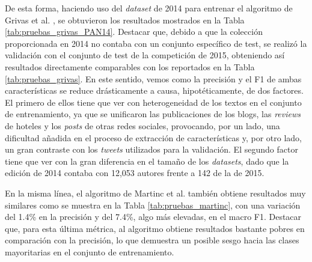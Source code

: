 \bigskip
De esta forma, haciendo uso del \textit{dataset} de 2014 para entrenar el algoritmo de Grivas et al. \cite{grivas2015author}, se obtuvieron los resultados
mostrados en la Tabla \ref{tab:pruebas_grivas_PAN14}. Destacar que, debido a que la colección proporcionada en 2014 no contaba con un conjunto específico de test, se realizó la validación
con el conjunto de test de la competición de 2015, obteniendo así resultados directamente comparables con los reportados en la Tabla \ref{tab:pruebas_grivas}.
En este sentido, vemos como la precisión y el F1 de ambas características se reduce drásticamente a causa, hipotéticamente, de dos factores. El primero de ellos
tiene que ver con heterogeneidad de los textos en el conjunto de entrenamiento, ya que se unificaron las publicaciones de los blogs, las \textit{reviews} de hoteles y
los \textit{posts} de otras redes sociales, provocando, por un lado, una dificultad añadida en el proceso de extracción de características y, por otro lado,
un gran contraste con los \textit{tweets} utilizados para la validación. El segundo factor tiene que ver con la gran diferencia en el tamaño de los \textit{datasets},
dado que la edición de 2014 contaba con 12,053 autores frente a 142 de la de 2015.

\bigskip
\begin{table}[H]
	\centering
	\caption{Resultados de las pruebas realizadas con el \textit{dataset} de 2014 para el algoritmo de Grivas et al. \cite{grivas2015author}}
	\label{tab:pruebas_grivas_PAN14}
\end{table}

\bigskip
En la misma línea, el algoritmo de Martinc et al. \cite{martinc2019hot} también obtiene resultados muy similares como se muestra en la Tabla \ref{tab:pruebas_martinc},
con una variación del 1.4\% en la precisión y del 7.4\%, algo más elevadas, en el macro F1. Destacar que, para esta última métrica, al algoritmo obtiene
resultados bastante pobres en comparación con la precisión, lo que demuestra un posible sesgo hacia las clases mayoritarias en el conjunto de entrenamiento.

